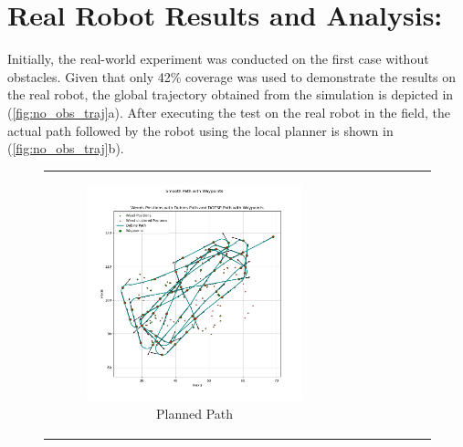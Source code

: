 \vspace{3mm}   


\section{Real Robot Results and Analysis:}    

Initially, the real-world experiment was conducted on the first case without obstacles. Given that only 42\% coverage was used to demonstrate the results on the real robot, the global trajectory obtained from the simulation is depicted in (\autoref{fig:no_obs_traj}a). After executing the test on the real robot in the field, the actual path followed by the robot using the local planner is shown in (\autoref{fig:no_obs_traj}b).

\begin{figure}[H]
    \centering
    \begin{tabular}{cc} 
        \begin{subfigure}{0.4\textwidth}
            \centering
            \includegraphics[width=\textwidth]{Images/real_robot/no_obs_path.png}
            \caption{Planned Path}
        \end{subfigure} 
        &
        \begin{subfigure}{0.4\textwidth}
            \centering

\end{subfigure}
\end{tabular}
\end{figure}
